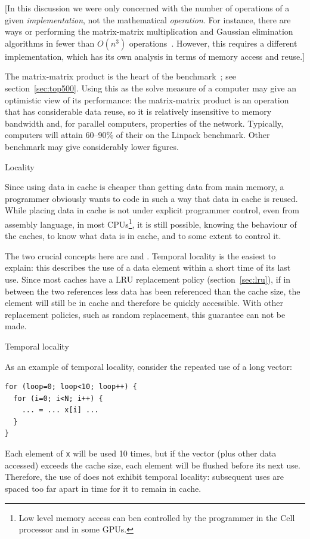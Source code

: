 [In this discussion we were only concerned with the number of
  operations of a given \emph{implementation}, not the mathematical
  \emph{operation}. For instance, there are ways or performing the
  matrix-matrix multiplication and Gaussian elimination algorithms in
  fewer than $O(n^3)$
  operations~\cite{St:gaussnotoptimal,Pa:combinations}. However, this
  requires a different implementation, which has its own analysis in
  terms of memory access and reuse.]

The matrix-matrix product is the heart of the 
{benchmark}~\cite{Dongarra1987LinpackBenchmark}; see
section~\ref{sec:top500}. Using this as the solve measure of
 a computer may give an optimistic view of its
performance: the matrix-matrix product is an operation
that has considerable data reuse, so it is relatively insensitive to
memory bandwidth and, for parallel computers, properties of the
network. Typically, computers will attain 60--90\% of their
 on the Linpack benchmark. Other benchmark
may give considerably lower figures.

 {Locality}
\label{sec:locality}

Since using data in cache is cheaper than getting data from main
memory, a programmer obviously wants to code in such a way that data
in cache is reused. While placing data in cache is not under explicit
programmer control, even from assembly language, in most
CPUs\footnote{Low level memory access can ben controlled by the
  programmer in the Cell processor and in some GPUs.}, it is still
possible, knowing the behaviour of the caches, to know
what data is in cache, and to some extent to control it.

The two crucial concepts here are
 and
. Temporal locality is the easiest to explain: this
describes the use of a data element within a short time of its last
use.  Since most caches have a \ac{LRU} replacement policy
(section~\ref{sec:lru}), if in between the two references less data
has been referenced than the cache size, the element will still be in
cache and therefore be quickly accessible. With other replacement
policies, such as random replacement, this guarantee can not be made.

 {Temporal locality}

As an example of temporal locality, consider the repeated use of a
long vector:
\begin{verbatim}
for (loop=0; loop<10; loop++) {
  for (i=0; i<N; i++) {
    ... = ... x[i] ...
  }
}
\end{verbatim}
Each element of \texttt{x} will be used 10 times, but if the vector
(plus other data accessed) exceeds
the cache size, each element will be flushed before its
next use. Therefore, the use of  does not exhibit temporal
locality: subsequent uses are spaced too far apart in time for it to
remain in cache. 

